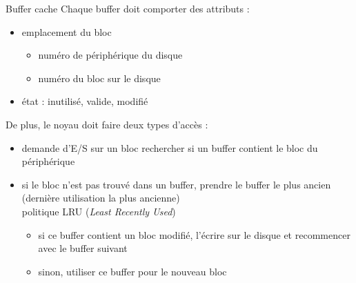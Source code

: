\begin {frame} {Buffer cache}
    Chaque buffer doit comporter des attributs :
    \begin {itemize}
	\item emplacement du bloc
	    \begin {itemize}
		\item numéro de périphérique du disque
		\item numéro du bloc sur le disque
	    \end {itemize}
	\item état : inutilisé, valide, modifié
    \end {itemize}

    \vspace* {3mm}

    De plus, le noyau doit faire deux types d'accès :

    \begin {itemize}
	\item demande d'E/S sur un bloc \implique rechercher si un
	    buffer contient le bloc  du périphérique

	\item si le bloc n'est pas trouvé dans un buffer, prendre
	    le buffer le plus ancien (dernière utilisation la plus
	    ancienne)
	    \\
	    \implique politique LRU (\textit {Least Recently Used\/})

	    \begin {itemize}
		\item si ce buffer contient un bloc modifié, l'écrire
		    sur le disque et recommencer avec le buffer suivant
		\item sinon, utiliser ce buffer pour le nouveau bloc
	    \end {itemize}

    \end {itemize}
\end {frame}


